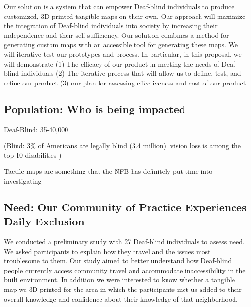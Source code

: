 Our solution is a system that can empower Deaf-blind individuals to produce  customized, 3D printed tangible maps on their own. Our approach will maximize the integration of Deaf-blind individuals into society by increasing their independence and their self-sufficiency. Our solution combines a method for generating custom maps with an accessible tool for generating these maps. We will iterative test our prototypes and process. In particular, in this proposal, we will demonstrate (1) The efficacy of our product in meeting the needs of Deaf-blind individuals (2)  The iterative process that will allow us to define, test, and refine our product (3) our plan for assessing effectiveness and cost of our product. 

\subsection{Population: Who is being impacted}

Deaf-Blind: 35-40,000 \cite{watson1993model}

(Blind: 3\% of Americans are legally blind (3.4 million); vision loss is among the top 10 disabilities )

Tactile maps are something that the NFB has definitely put time into investigating \cite{lobben2015tactile}


\subsection{Need: Our Community of Practice Experiences Daily Exclusion}

We conducted a  preliminary study with 27 Deaf-blind individuals to assess need. We asked participants to explain how they travel and the issues most troublesome to them. 
Our study aimed to better understand how Deaf-blind people currently access community travel and 
accommodate inaccessibility in the built environment. In addition we were interested to know whether a tangible map we 3D printed for the area in which the participants met us added to their overall knowledge and confidence about their knowledge of that neighborhood.

